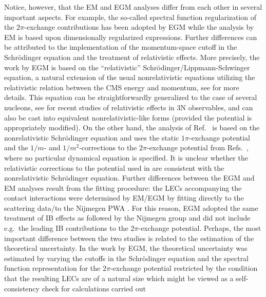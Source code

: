 \documentclass[aps,rmp,nofootinbib,twocolumn,floatfix]{revtex4}
\begin{document}
Notice, however, that the EM and EGM analyses differ from each other in
several important aspects. For example, the so-called spectral function
regularization \cite{Epelbaum:2003gr,Epelbaum:2003xx} 
of the $2\pi$-exchange contributions has been adopted by EGM
while the analysis by EM is based upon dimensionally regularized expressions. 
Further differences can be attributed to the implementation of the
momentum-space cutoff in the Schr\"odinger equation and the treatment of
relativistic effects. More precisely, the work by EGM is based on the
``relativistic'' Schr\"odinger/Lippmann-Schwinger equation, a natural
extension of the usual nonrelativistic equations utilizing the
relativistic relation between the CMS energy and momentum, see \cite{Friar:1999sj} for
more details. This equation can be straightforwardly generalized to the case
of several nucleons, see \cite{Witala:2004pv,Lin:2007kg,Lin:2008sy} for recent studies of relativistic
effects in 3N observables, and can also be cast into equivalent 
nonrelativistic-like forms \cite{Kamada:1999wy,Friar:1999sj} 
(provided the potential is appropriately modified). On the other hand, the
analysis of Ref.~\cite{Entem:2003ft} is based on the  
nonrelativistic Schr\"odinger equation and uses the static $1\pi$-exchange
potential and 
the $1/m$- and $1/m^2$-corrections to the  
$2\pi$-exchange potential from Refs.~\cite{Kaiser:1997mw,Kaiser:2001at}, where no
particular dynamical equation is specified.  
It is unclear whether the relativistic corrections to the
potential used in \cite{Entem:2003ft} 
are consistent with the nonrelativistic Schr\"odinger equation. Further
differences between the EGM and EM analyses result from the fitting
procedure: the LECs accompanying the contact interactions were determined by
EM/EGM by fitting directly to the scattering data/to the Nijmegen PWA
\cite{Stoks:1993tb,NNonline}. For this reason, EGM adopted the same treatment
of IB effects as followed by the Nijmegen group and did not include e.g.~the
leading IB contributions to the $2\pi$-exchange potential. Perhaps, the most
important difference between the two studies is related to the estimation of
the theoretical uncertainty. In the work by EGM, the theoretical uncertainty
was estimated by varying the cutoffs in the Schr\"odinger equation and
the spectral function representation for the $2\pi$-exchange potential 
restricted by the condition that the resulting
LECs  are of a natural size
which might be viewed as a self-consistency check for calculations carried out
\end{document}
